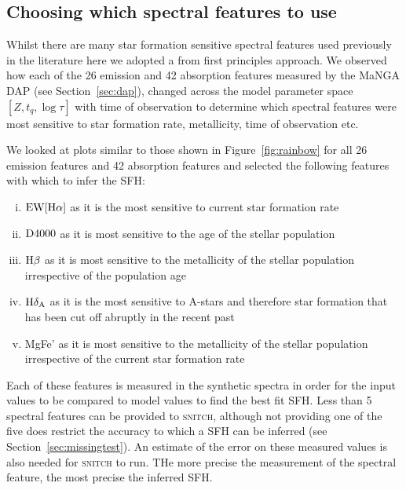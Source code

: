 \documentclass[useAMS,usenatbib]{mn2e}
\begin{document}
\subsection{Choosing which spectral features to use}

Whilst there are many star formation sensitive spectral features used previously in the literature \citep{ref} here we adopted a from first principles approach. We observed how each of the 26 emission and 42 absorption features measured by the MaNGA DAP (see Section~\ref{sec:dap}), changed across the model parameter space $[Z, t_q, \log \tau]$ with time of observation to determine which spectral features were most sensitive to star formation rate, metallicity, time of observation etc. 

We looked at plots similar to those shown in Figure~\ref{fig:rainbow} for all 26 emission features and 42 absorption features and selected the following features with which to infer the SFH:
\begin{enumerate}[(i)]
\item $\rm{EW}[H\alpha]$ as it is the most sensitive to current star formation rate


\item $\rm{D}4000$ as it is most sensitive to the age of the stellar population

\item $\rm{H}\beta$ as it is most sensitive to the metallicity of the stellar population irrespective of the population age

\item $\rm{H}\delta_A$ as it is the most sensitive to A-stars and therefore star formation that has been cut off abruptly in the recent past

\item MgFe' as it is most sensitive to the metallicity of the stellar population irrespective of the current star formation rate
\end{enumerate}

Each of these features is measured in the synthetic spectra in order for the input values to be compared to model values to find the best fit SFH. Less than 5 spectral features can be provided to \textsc{snitch}, although not providing one of the five does restrict the accuracy to which a SFH can be inferred (see Section~\ref{sec:missingtest}). An estimate of the error on these measured values is also needed for \textsc{snitch} to run. THe more precise the measurement of the spectral feature, the most precise the inferred SFH.  
\end{document}
